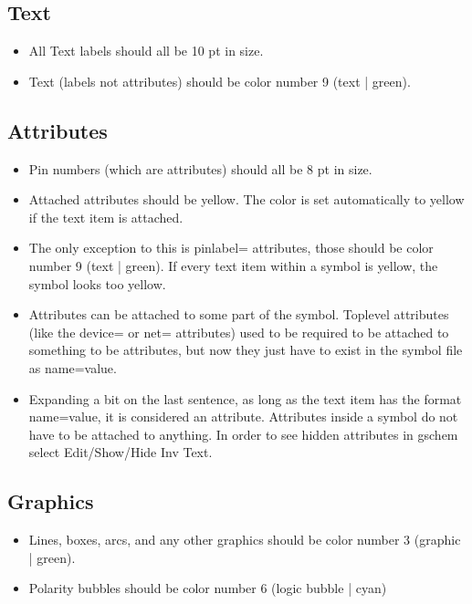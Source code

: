 \documentclass{article}
\begin{document}
\subsection{Text}

\begin{itemize}
\item All Text labels should all be 10 pt in size.
\item Text (labels not attributes) should be color number 9 (text | green).
\end{itemize}

\subsection{Attributes}
\begin{itemize}
\item Pin numbers (which are attributes) should all be 8 pt in size.
\item Attached attributes should be yellow.  The color is set
      automatically to yellow if the text item is attached.
\item The only exception to this is pinlabel= attributes, those should be
      color number 9 (text | green).  If every text item within a symbol is
      yellow, the symbol looks too yellow.
\item Attributes can be attached to some part of the symbol.
      Toplevel attributes (like the device= or net= attributes) used to
      be required to be attached to something to be attributes, but now
      they just have to exist in the symbol file as name=value.
\item Expanding a bit on the last sentence, as long as the text item
      has the format name=value, it is considered an attribute.
      Attributes inside a symbol do not have to be attached to anything.
      In order to see hidden attributes in gschem select Edit/Show/Hide Inv
      Text.


\end{itemize}

\subsection{Graphics}

\begin{itemize}
\item Lines, boxes, arcs, and any other graphics should be color number 3 
      (graphic | green).
\item Polarity bubbles should be color number 6 (logic bubble | cyan) 
\end{itemize}
\end{document}
